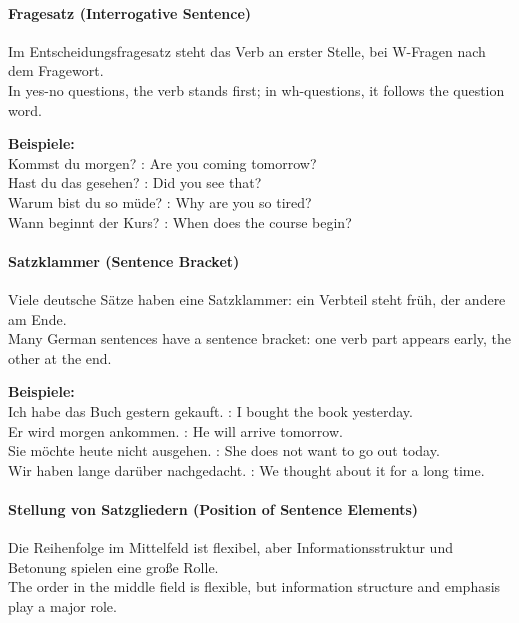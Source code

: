 \documentclass[a4paper]{article}
\begin{document}
        \paragraph{Fragesatz {\small (Interrogative Sentence)}}
            Im Entscheidungsfragesatz steht das Verb an erster Stelle, bei W-Fragen nach dem Fragewort.\\
            In yes-no questions, the verb stands first; in wh-questions, it follows the question word.
            
            \textbf{Beispiele:}\\
            Kommst du morgen? : Are you coming tomorrow?\\
            Hast du das gesehen? : Did you see that?\\
            Warum bist du so müde? : Why are you so tired?\\
            Wann beginnt der Kurs? : When does the course begin?
        
        \paragraph{Satzklammer {\small (Sentence Bracket)}}
            Viele deutsche Sätze haben eine Satzklammer: ein Verbteil steht früh, der andere am Ende.\\
            Many German sentences have a sentence bracket: one verb part appears early, the other at the end.
            
            \textbf{Beispiele:}\\
            Ich habe das Buch gestern gekauft. : I bought the book yesterday.\\
            Er wird morgen ankommen. : He will arrive tomorrow.\\
            Sie möchte heute nicht ausgehen. : She does not want to go out today.\\
            Wir haben lange darüber nachgedacht. : We thought about it for a long time.
        
        \paragraph{Stellung von Satzgliedern {\small (Position of Sentence Elements)}}
            Die Reihenfolge im Mittelfeld ist flexibel, aber Informationsstruktur und Betonung spielen eine große Rolle.\\
            The order in the middle field is flexible, but information structure and emphasis play a major role.
            
\end{document}
